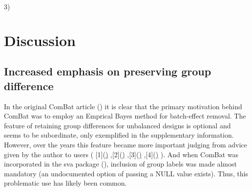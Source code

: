 \documentclass{bio}
\begin{document}



3) 


\section{Discussion}

\subsection{Increased emphasis on preserving group difference}

In the original ComBat article (\citealp{Johnson2007}) it is clear that the primary motivation behind ComBat was to employ an Emprical Bayes method for batch-effect removal. The feature of retaining group differences for unbalanced designs is optional and seems to be subordinate, only exemplified in the supplementary information. However, over the years this feature became more important judging from advice given by the author to users
(
[1](\href{https://groups.google.com/d/msg/combat-user-forum/eSVSKwGtuyE/ZIWV2juYmmAJ})
,[2](\href{https://groups.google.com/d/msg/combat-user-forum/Vkb9p7wekd4/h5Etie7FTVQJ})
,[3](\href{https://groups.google.com/d/msg/combat-user-forum/fpBTcgDjiR8/uo4QIZL4sZgJ})
,[4](\href{https://groups.google.com/d/msg/combat-user-forum/26FZlgU2LFQ/W6U_Lhh_64EJ})
).   
And when ComBat was incorporated in the sva package (\citealp{Leek2012}), inclusion of group labels was made almost mandatory (an undocumented option of passing a NULL value exists). Thus, this problematic use has likely been common.
\end{document}
